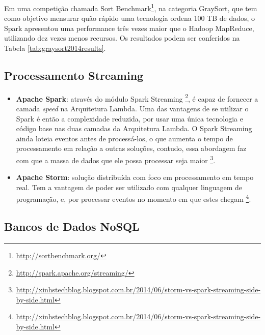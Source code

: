 Em uma competição chamada Sort
Benchmark\footnote{\url{http://sortbenchmark.org/}}, na categoria GraySort,
que tem como objetivo mensurar quão rápido uma tecnologia ordena 100 TB de
dados, o Spark apresentou uma performance três vezes maior que o Hadoop
MapReduce, utilizando dez vezes menos recursos. Os resultados podem ser
conferidos na Tabela \ref{tab:graysort2014results}.

\subsection{Processamento Streaming}

\begin{itemize}
    \item \textbf{Apache Spark}: através do módulo Spark Streaming
\footnote{\url{http://spark.apache.org/streaming/}}, é capaz de fornecer a
camada \textit{speed} na Arquitetura Lambda. Uma das vantagens de se utilizar
o Spark é então a complexidade reduzida, por usar uma única tecnologia e
código base nas duas camadas da Arquitetura Lambda. O Spark Streaming ainda
loteia eventos antes de processá-los, o que aumenta o tempo de processamento
em relação a outras soluções, contudo, essa abordagem faz com que a massa de
dados que ele possa processar seja maior
\footnote{\url{http://xinhstechblog.blogspot.com.br/2014/06/storm-vs-spark-streaming-side-by-side.html}}.

    \item \textbf{Apache Storm}: solução distribuída com foco em processamento
em tempo real. Tem a vantagem de poder ser utilizado com qualquer linguagem de
programação, e, por processar eventos no momento em que estes chegam
\footnote{\url{http://xinhstechblog.blogspot.com.br/2014/06/storm-vs-spark-streaming-side-by-side.html}}.

\end{itemize}

\subsection{Bancos de Dados NoSQL}

